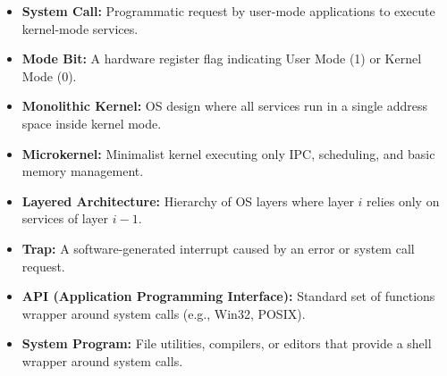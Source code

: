 \documentclass[12pt,a4paper]{article}
\begin{document}
\begin{tcolorbox}[defbox, title={\textbf{One-Line Definitions}}]
\begin{itemize}[leftmargin=*, itemsep=2.5pt, topsep=0pt]
  \item \textbf{System Call:} Programmatic request by user-mode applications to execute kernel-mode services.
  \item \textbf{Mode Bit:} A hardware register flag indicating User Mode (1) or Kernel Mode (0).
  \item \textbf{Monolithic Kernel:} OS design where all services run in a single address space inside kernel mode.
  \item \textbf{Microkernel:} Minimalist kernel executing only IPC, scheduling, and basic memory management.
  \item \textbf{Layered Architecture:} Hierarchy of OS layers where layer $i$ relies only on services of layer $i-1$.
  \item \textbf{Trap:} A software-generated interrupt caused by an error or system call request.
  \item \textbf{API (Application Programming Interface):} Standard set of functions wrapper around system calls (e.g., Win32, POSIX).
  \item \textbf{System Program:} File utilities, compilers, or editors that provide a shell wrapper around system calls.
\end{itemize}
\end{tcolorbox}
\end{document}
